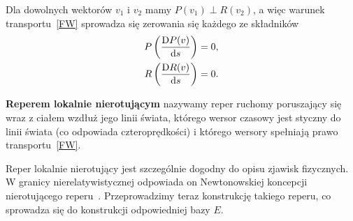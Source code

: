 Dla dowolnych wektorów $v_1$ i $v_2$ mamy $P(v_1)\perp R(v_2)$,
a więc warunek transportu~\eqref{FW} 
sprowadza się zerowania się każdego ze składników
\begin{align*}
P \left(\frac{\text{D} P(v)}{\text{d} s} \right)  = 0 ,\\
R \left( \frac{\text{D} R(v)}{\text{d} s} \right) = 0.
\end{align*}




\begin{definition}
\textbf{Reperem lokalnie nierotującym} nazywamy reper ruchomy poruszający
się wraz z ciałem wzdłuż jego linii świata, którego 
wersor czasowy jest styczny do linii świata (co odpowiada czteroprędkości)
i którego wersory spełniają prawo transportu~\eqref{FW}.
\end{definition}
Reper lokalnie nierotujący jest szczególnie dogodny do opisu zjawisk 
fizycznych. W granicy nierelatywistycznej odpowiada on Newtonowskiej 
koncepcji nierotującego reperu~\cite{synge1960}. Przeprowadzimy teraz
konstrukcję takiego reperu, co sprowadza się do konstrukcji 
odpowiedniej bazy $E$.

